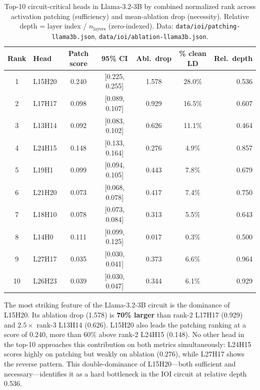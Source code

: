 \documentclass[11pt,a4paper]{article}
\begin{document}
\begin{table}[H]
  \centering
  \caption{Top-10 circuit-critical heads in Llama-3.2-3B by combined normalized rank
    across activation patching (sufficiency) and mean-ablation drop (necessity).
    Relative depth = layer index / $n_\text{layers}$ (zero-indexed).
    Data: \texttt{data/ioi/patching-llama3b.json},
    \texttt{data/ioi/ablation-llama3b.json}.}
  \label{tab:llama-circuit}
  \smallskip
  \begin{tabular}{clccccr}
    \toprule
    Rank & Head    & Patch score & 95\% CI          & Abl.\ drop & \% clean LD & Rel.\ depth \\
    \midrule
    1    & L15H20  & 0.240       & [0.225, 0.255]   & 1.578       & 28.0\%      & 0.536 \\
    2    & L17H17  & 0.098       & [0.089, 0.107]   & 0.929       & 16.5\%      & 0.607 \\
    3    & L13H14  & 0.092       & [0.083, 0.102]   & 0.626       & 11.1\%      & 0.464 \\
    4    & L24H15  & 0.148       & [0.133, 0.164]   & 0.276       &  4.9\%      & 0.857 \\
    5    & L19H1   & 0.099       & [0.094, 0.105]   & 0.443       &  7.8\%      & 0.679 \\
    6    & L21H20  & 0.073       & [0.068, 0.078]   & 0.417       &  7.4\%      & 0.750 \\
    7    & L18H10  & 0.078       & [0.073, 0.084]   & 0.313       &  5.5\%      & 0.643 \\
    8    & L14H0   & 0.111       & [0.099, 0.125]   & 0.017       &  0.3\%      & 0.500 \\
    9    & L27H17  & 0.035       & [0.030, 0.041]   & 0.373       &  6.6\%      & 0.964 \\
    10   & L26H23  & 0.039       & [0.030, 0.047]   & 0.344       &  6.1\%      & 0.929 \\
    \bottomrule
  \end{tabular}
\end{table}

The most striking feature of the Llama-3.2-3B circuit is the dominance of L15H20. Its
ablation drop (1.578) is \textbf{70\% larger} than rank-2 L17H17 (0.929) and
$\mathbf{2.5\times}$ rank-3 L13H14 (0.626). L15H20 also leads the patching ranking at
a score of 0.240, more than 60\% above rank-2 L24H15 (0.148). No other head in the
top-10 approaches this contribution on both metrics simultaneously: L24H15 scores
highly on patching but weakly on ablation (0.276), while L27H17 shows the reverse
pattern. This double-dominance of L15H20---both sufficient and necessary---identifies
it as a hard bottleneck in the IOI circuit at relative depth 0.536.
\end{document}
